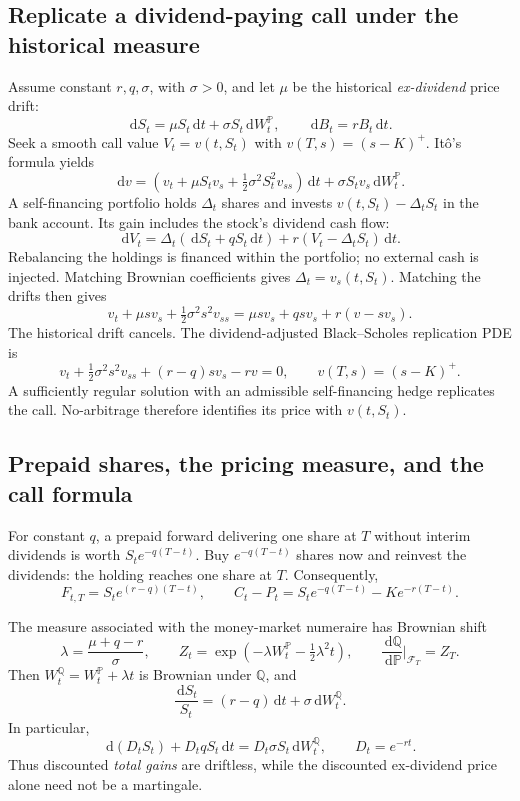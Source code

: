 \documentclass[10pt]{article}
\newcommand{\Pp}{\mathbb P}
\newcommand{\Q}{\mathbb Q}
\newcommand{\1}{\mathbf 1}
\newcommand{\cF}{\mathcal F}
\newcommand{\dd}{\,\mathrm d}
\theoremstyle{definition}
\begin{document}
\subsection{Replicate a dividend-paying call under the historical measure}

Assume constant \(r,q,\sigma\), with \(\sigma>0\), and let \(\mu\) be the
historical \emph{ex-dividend} price drift:
\[
\dd S_t=\mu S_t\dd t+\sigma S_t\dd W_t^{\Pp},
\qquad \dd B_t=rB_t\dd t.
\]
Seek a smooth call value \(V_t=v(t,S_t)\) with
\(v(T,s)=(s-K)^+\). It\^o's formula yields
\[
\dd v=\left(v_t+\mu S_tv_s+\tfrac12\sigma^2S_t^2v_{ss}\right)\dd t
       +\sigma S_tv_s\dd W_t^{\Pp}.
\]
A self-financing portfolio holds \(\Delta_t\) shares and invests
\(v(t,S_t)-\Delta_tS_t\) in the bank account. Its gain includes the
stock's dividend cash flow:
\[
\boxed{
\dd V_t=\Delta_t(\dd S_t+qS_t\dd t)
+r(V_t-\Delta_tS_t)\dd t.}
\]
Rebalancing the holdings is financed within the portfolio; no external
cash is injected. Matching Brownian coefficients gives
\(\Delta_t=v_s(t,S_t)\). Matching the drifts then gives
\[
 v_t+\mu s v_s+\tfrac12\sigma^2s^2v_{ss}
 =\mu s v_s+qs v_s+r(v-sv_s).
\]
The historical drift cancels. The dividend-adjusted Black--Scholes
replication PDE is
\[
\boxed{
 v_t+\tfrac12\sigma^2s^2v_{ss}+(r-q)sv_s-rv=0,
 \qquad v(T,s)=(s-K)^+.}
\]
A sufficiently regular solution with an admissible self-financing hedge
replicates the call. No-arbitrage therefore identifies its price with
\(v(t,S_t)\).

\subsection{Prepaid shares, the pricing measure, and the call formula}

For constant \(q\), a prepaid forward delivering one share at \(T\)
without interim dividends is worth \(S_te^{-q(T-t)}\). Buy
\(e^{-q(T-t)}\) shares now and reinvest the dividends: the holding reaches
one share at \(T\). Consequently,
\[
\boxed{
F_{t,T}=S_te^{(r-q)(T-t)},\qquad
C_t-P_t=S_te^{-q(T-t)}-Ke^{-r(T-t)}.}
\]

The measure associated with the money-market numeraire has Brownian shift
\[
\lambda=\frac{\mu+q-r}{\sigma},\qquad
Z_t=\exp(-\lambda W_t^{\Pp}-\tfrac12\lambda^2t),\qquad
\frac{\dd\Q}{\dd\Pp}\bigg|_{\cF_T}=Z_T.
\]
Then \(W_t^{\Q}=W_t^{\Pp}+\lambda t\) is Brownian under \(\Q\), and
\[
\boxed{\frac{\dd S_t}{S_t}=(r-q)\dd t+\sigma\dd W_t^{\Q}.}
\]
In particular,
\[
\dd(D_tS_t)+D_tqS_t\dd t=D_t\sigma S_t\dd W_t^{\Q},
\qquad D_t=e^{-rt}.
\]
Thus discounted \emph{total gains} are driftless, while the discounted
ex-dividend price alone need not be a martingale.
\end{document}
